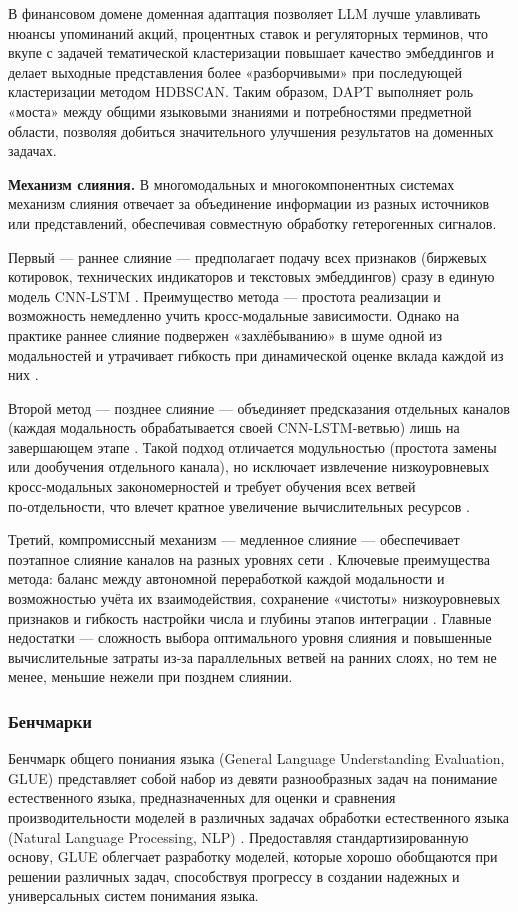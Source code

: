 В финансовом домене доменная адаптация позволяет LLM лучше улавливать нюансы упоминаний акций, процентных ставок
и регуляторных терминов, что вкупе с задачей тематической кластеризации повышает качество эмбеддингов и делает
выходные представления более «разборчивыми» при последующей кластеризации методом HDBSCAN. Таким образом, DAPT
выполняет роль «моста» между общими языковыми знаниями и потребностями предметной области, позволяя добиться
значительного улучшения результатов на доменных задачах.

\textbf{Механизм слияния.} В многомодальных и многокомпонентных системах механизм слияния отвечает за объединение
информации из разных источников или представлений, обеспечивая совместную обработку гетерогенных сигналов.

Первый --- раннее слияние --- предполагает подачу всех признаков (биржевых котировок, технических индикаторов
и текстовых эмбеддингов) сразу в единую модель CNN‑LSTM \parencite{Karpathy_2014_CVPR, dutt2022shared}. Преимущество
метода --- простота реализации и возможность немедленно учить кросс‑модальные зависимости. Однако на практике
раннее слияние подвержен «захлёбыванию» в шуме одной из модальностей и утрачивает гибкость при динамической
оценке вклада каждой из них \parencite{dutt2022shared}.

Второй метод --- позднее слияние --- объединяет предсказания отдельных каналов (каждая модальность обрабатывается
своей CNN-LSTM-ветвью) лишь на завершающем этапе \parencite{Karpathy_2014_CVPR, ortega2019multimodal}.
Такой подход отличается модульностью (простота замены или дообучения отдельного канала), но исключает
извлечение низкоуровневых кросс‑модальных закономерностей и требует обучения всех ветвей по‑отдельности,
что влечет кратное увеличение вычислительных ресурсов \parencite{dutt2022shared}.

Третий, компромиссный механизм --- медленное слияние --- обеспечивает поэтапное слияние каналов
на разных уровнях сети \parencite{feichtenhofer2016convolutional, dutt2022shared}. Ключевые преимущества метода:
баланс между автономной переработкой каждой модальности и возможностью учёта их взаимодействия, сохранение
«чистоты» низкоуровневых признаков и гибкость настройки числа и глубины этапов интеграции \parencite{Karpathy_2014_CVPR}.
Главные недостатки --- сложность выбора оптимального уровня слияния и повышенные вычислительные затраты из‑за
параллельных ветвей на ранних слоях, но тем не менее, меньшие нежели при позднем слиянии.

\subsubsection{Бенчмарки}
\label{sec:benchmarks}
Бенчмарк общего пониания языка (General Language Understanding Evaluation, GLUE) представляет собой набор из девяти
разнообразных задач на понимание естественного языка, предназначенных для оценки и сравнения производительности моделей
в различных задачах обработки естественного языка (Natural Language Processing, NLP) \parencite{wang2018GLUE}.
Предоставляя стандартизированную основу, GLUE облегчает разработку моделей, которые хорошо обобщаются при решении
различных задач, способствуя прогрессу в создании надежных и универсальных систем понимания языка.

